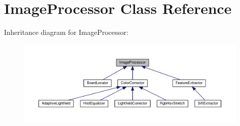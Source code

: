 \hypertarget{classImageProcessor}{}\section{Image\+Processor Class Reference}
\label{classImageProcessor}


Inheritance diagram for Image\+Processor\+:\nopagebreak
\begin{figure}[H]
\begin{center}
\leavevmode
\includegraphics[width=350pt]{classImageProcessor__inherit__graph}
\end{center}
\end{figure}
